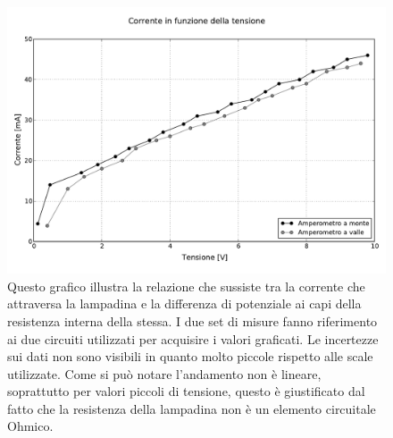 \begin{figure}
        \centering
        \includegraphics[scale=0.50]{lampadina.pdf}
        \caption{Questo grafico illustra la relazione che sussiste tra la corrente che attraversa la lampadina e la differenza di potenziale ai capi della resistenza interna della stessa. I due set di misure fanno riferimento ai due circuiti utilizzati per acquisire i valori graficati. Le incertezze sui dati non sono visibili in quanto molto piccole rispetto alle scale utilizzate. Come si può notare l'andamento non è lineare, soprattutto per valori piccoli di tensione, questo è giustificato dal fatto che la resistenza della lampadina non è un elemento circuitale Ohmico.}
        \label{fig:lampadina}
\end{figure}

